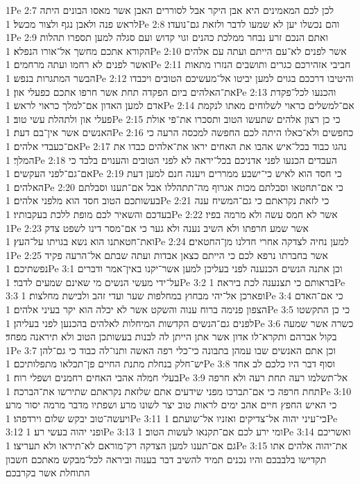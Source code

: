 1Pe 2:7  לכן לכם המאמינים היא אבן היקר אבל לסוררים האבן אשר מאסו הבונים היתה לראש פנה ולאבן נגף ולצור מכשל׃
1Pe 2:8  והם נכשלו יען לא שמעו לדבר ולזאת גם־נועדו׃
1Pe 2:9  ואתם הנכם זרע נבחר ממלכת כהנים וגוי קדוש ועם סגלה למען תספרו תהלות הקורא אתכם מחשך אל־אורו הנפלא׃
1Pe 2:10  אשר לפנים לא־עם הייתם ועתה עם אלהים ואשר לפנים לא רחמו ועתה מרחמים׃
1Pe 2:11  חביבי אזהירכם כגרים ותושבים הנזרו מתאות הבשר המתגרות בנפש׃
1Pe 2:12  והיטיבו דרככם בגוים למען יביטו אל־מעשיכם הטובים ויכבדו את־האלהים ביום הפקדה תחת אשר חרפו אתכם כפעלי און׃
1Pe 2:13  והכנעו לכל־פקדת אדם למען האדון אם־למלך כראוי לראש׃
1Pe 2:14  אם־למשלים כראוי לשלוחים מאתו לנקמת פעלי און ולתהלת עשי טוב׃
1Pe 2:15  כי כן רצון אלהים שתעשו הטוב ותסכרו את־פי אולת האנשים אשר אין־בם דעת׃
1Pe 2:16  כחפשים ולא־כאלו היתה לכם החפשה למכסה הרעה כי אם־כעבדי אלהים׃
1Pe 2:17  נהגו כבוד בכל־איש אהבו את האחים יראו את־אלהים כבדו את המלך׃
1Pe 2:18  העבדים הכנעו לפני אדניכם בכל־יראה לא לפני הטובים והענוים בלבד כי אם־גם־לפני העקשים׃
1Pe 2:19  כי חסד הוא לאיש כי־ישבע ממררים ויענה חנם למען דעת האלהים׃
1Pe 2:20  כי אם־תחטאו וסבלתם מכות אגרוף מה־תתהללו אבל אם־תענו וסבלתם בעשותכם הטוב חסד הוא מלפני אלהים׃
1Pe 2:21  כי לזאת נקראתם כי גם־המשיח ענה בעדכם והשאיר לכם מופת ללכת בעקבותיו׃
1Pe 2:22  אשר לא חמס עשה ולא מרמה בפיו׃
1Pe 2:23  אשר שמע חרפתו ולא השיב נענה ולא גער כי אם־מסר דינו לשפט צדק ואת־חטאתנו הוא נשא בגויתו על־העץ׃
1Pe 2:24  למען נחיה לצדקה אחרי חדלנו מן־החטאים׃
1Pe 2:25  אשר בחברתו נרפא לכם כי הייתם כצאן אבדות ועתה שבתם אל־הרעה פקיד נפשתיכם׃
1Pe 3:1  וכן אתנה הנשים הכנענה לפני בעליכן למען אשר־יקנו באין־אמר ודברים על־ידי מעשי הנשים מי שאינם שמעים לדבר׃
1Pe 3:2  בראותם כי תצנענה לכת ביראה׃
1Pe 3:3  ופארכן אל־יהי מבחוץ במחלפות שער ועדי זהב ולבישת מחלצות׃
1Pe 3:4  כי אם־האדם הצפון פנימה ברוח ענוה והשקט אשר לא יכלה הוא יקר בעיני אלהים׃
1Pe 3:5  כי כן התקשטו לפנים גם־הנשים הקדשות המיחלות לאלהים בהכנען לפני בעליהן׃
1Pe 3:6  כשרה אשר שמעה בקול אברהם ותקרא־לו אדון אשר אתן הייתן לה לבנות בעשותכן הטוב ולא תיראנה מפחד׃
1Pe 3:7  וכן אתם האנשים שבו עמהן בתבונה כי־כלי רפה האשה ותנו־לה כבוד כי גם־להן יש־חלק בנחלת מתנת החיים פן־תכלאו מתפלותיכם׃
1Pe 3:8  וסוף דבר היו כלכם לב אחד בעלי חמלה אהבי האחים רחמנים ושפלי רוח׃
1Pe 3:9  אל־תשלמו רעה תחת רעה ולא חרפה תחת חרפה כי אם־תברכו מפני שידעים אתם שלזאת נקראתם שתירשו את־הברכה׃
1Pe 3:10  כי האיש החפץ חיים אהב ימים לראות טוב יצר לשונו מרע ושפתיו מדבר מרמה יסור מרע ויעשה־טוב יבקש שלום וירדפהו׃
1Pe 3:11  כי־עיני יהוה אל־צדיקים ואזניו אל־שועתם׃
1Pe 3:12  ופני יהוה בעשי רע׃
1Pe 3:13  ומי ירע לכם אם־תקנאו לעשות הטוב׃
1Pe 3:14  ואשריכם גם אם־תענו למען הצדקה רק־מוראם לא־תיראו ולא תעריצו׃
1Pe 3:15  את־יהוה אלהים אתו תקדישו בלבבכם והיו נכנים תמיד להשיב דבר בענוה וביראה לכל־מבקש מאתכם חשבון התוחלת אשר בקרבכם׃
